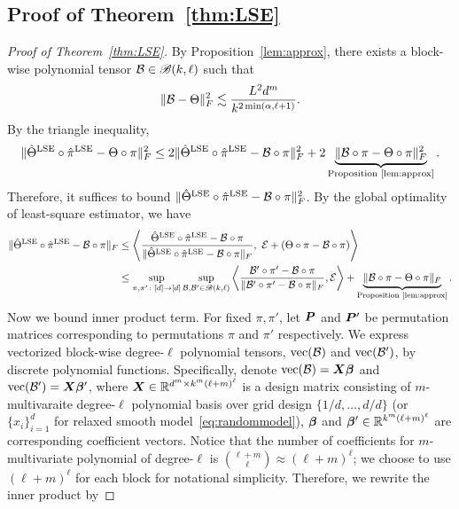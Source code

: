\documentclass[12pt]{article}
\theoremstyle{definition}
\def\caliB{\mathscr{B}}
\begin{document}
\subsection{Proof of Theorem~\ref{thm:LSE}}\label{sec:proofLSE}
\begin{proof}[Proof of Theorem~\ref{thm:LSE}]
By Proposition~\ref{lem:approx}, there exists a block-wise polynomial tensor $\tB\in\caliB(k,\ell)$ such that
\begin{equation}\label{eq:approx}
\lVert\mathcal{B}-\Theta\rVert_F^2\lesssim {L^2d^m\over k^{2\min(\alpha,\ell+1)}}.
\end{equation}
By the triangle inequality,
\begin{equation}\label{eq:tri}
\lVert\hat\Theta^\textup{LSE}\circ\hat\pi^\textup{LSE} -\Theta\circ \pi\rVert_F^2\leq 2\lVert\hat\Theta^\textup{LSE}\circ\hat\pi^\textup{LSE} -\mathcal{B}\circ \pi\rVert_F^2+2\underbrace{\lVert\mathcal{B}\circ \pi-\Theta\circ \pi\rVert_F^2}_{\textup{Proposition~\ref{lem:approx}}}.
\end{equation}
Therefore, it suffices to bound $\lVert\hat\Theta^\textup{LSE}\circ\hat\pi^\textup{LSE} -\mathcal{B}\circ \pi\rVert_F^2$. By the global optimality of least-square estimator, we have
\begin{align}
\FnormSize{}{\hat\Theta^\textup{LSE}\circ\hat\pi^\textup{LSE} -\tB\circ \pi}&\leq \left\langle {\hat \Theta^\textup{LSE}\circ \hat \pi^\textup{LSE}-\tB\circ \pi \over \FnormSize{}{ \hat \Theta^\textup{LSE}\circ \hat \pi^\textup{LSE}-\tB\circ \pi}},\ \tE+(\Theta\circ \pi-\tB\circ \pi) \right \rangle \\
&\leq \sup_{\pi, \pi'\colon[d]\to[d]}\sup_{\tB, \tB'\in \caliB(k,\ell)} \left\langle {\tB'\circ \pi'-\tB\circ \pi \over \FnormSize{}{\tB'\circ \pi'-\tB\circ \pi}}, \tE \right \rangle+\underbrace{\FnormSize{}{\tB\circ \pi-\Theta\circ \pi}}_{\textup{Proposition~\ref{lem:approx}}}.
\end{align}
Now we bound inner product term. For fixed $\pi,\pi'$, let $\bm{P}$ and $\bm{P}'$ be permutation matrices corresponding to permutations $\pi$ and $\pi'$ respectively. 
We express vectorized block-wise degree-$\ell$ polynomial tensors, $\text{vec}(\mathcal{B})$ and $\text{vec}(\mathcal{B}')$, by discrete polynomial functions. Specifically, denote $\text{vec}(\mathcal{B})=\bm X\boldsymbol{\beta}$ and $\text{vec}(\mathcal{B}')=\bm X\boldsymbol{\beta}'$, where $\bm X\in\mathbb{R}^{d^m\times k^m(\ell+m)^\ell}$ is a design matrix consisting of $m$-multivaraite degree-$\ell$ polynomial basis over grid design $\{1/d,\ldots,d/d\}$ (or $\{x_i\}_{i=1}^d$ for relaxed smooth model~\eqref{eq:randommodel}), $\boldsymbol{\beta}$ and $\boldsymbol{\beta}'\in\mathbb{R}^{k^m(\ell+m)^\ell}$ are corresponding coefficient vectors. Notice that the number of coefficients for $m$-multivariate polynomial of degree-$\ell$ is ${\ell+m \choose \ell} \approx (\ell+m)^\ell$; we choose to use $(\ell+m)^\ell$ for each block for notational simplicity. Therefore, we rewrite the inner product by

\end{proof}
\end{document}
